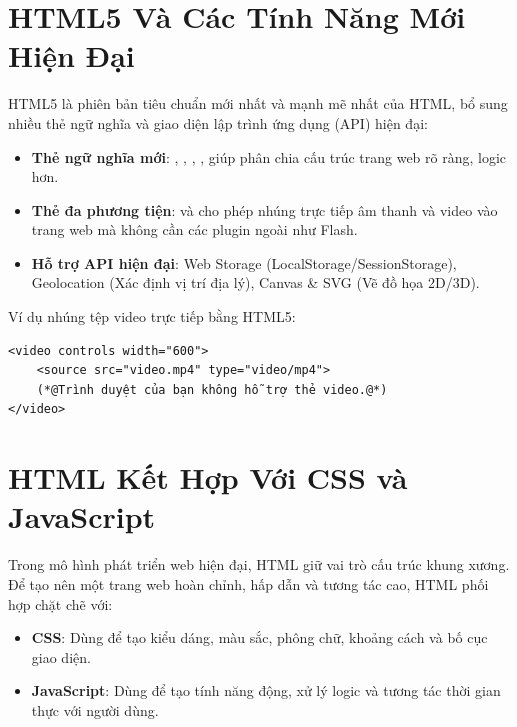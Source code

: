 \section{HTML5 Và Các Tính Năng Mới Hiện Đại}
\label{sec:html5_new_features}

HTML5 là phiên bản tiêu chuẩn mới nhất và mạnh mẽ nhất của HTML, bổ sung nhiều thẻ ngữ nghĩa và giao diện lập trình ứng dụng (API) hiện đại:

\begin{itemize}[leftmargin=1.8em, itemsep=3pt, parsep=0pt]
    \item \textbf{Thẻ ngữ nghĩa mới}: , , , ,  giúp phân chia cấu trúc trang web rõ ràng, logic hơn.
    \item \textbf{Thẻ đa phương tiện}:  và  cho phép nhúng trực tiếp âm thanh và video vào trang web mà không cần các plugin ngoài như Flash.
    \item \textbf{Hỗ trợ API hiện đại}: Web Storage (LocalStorage/SessionStorage), Geolocation (Xác định vị trí địa lý), Canvas \& SVG (Vẽ đồ họa 2D/3D).
\end{itemize}

Ví dụ nhúng tệp video trực tiếp bằng HTML5:
\begin{codeWindow}
\begin{lstlisting}[language=HTML5]
<video controls width="600">
    <source src="video.mp4" type="video/mp4">
    (*@Trình duyệt của bạn không hỗ trợ thẻ video.@*)
</video>
\end{lstlisting}
\end{codeWindow}

\section{HTML Kết Hợp Với CSS và JavaScript}
\label{sec:html_css_js_integration}

Trong mô hình phát triển web hiện đại, HTML giữ vai trò cấu trúc khung xương. Để tạo nên một trang web hoàn chỉnh, hấp dẫn và tương tác cao, HTML phối hợp chặt chẽ với:
\begin{itemize}[leftmargin=1.8em, itemsep=2pt, parsep=0pt]
    \item \textbf{CSS}: Dùng để tạo kiểu dáng, màu sắc, phông chữ, khoảng cách và bố cục giao diện.
    \item \textbf{JavaScript}: Dùng để tạo tính năng động, xử lý logic và tương tác thời gian thực với người dùng.
\end{itemize}

